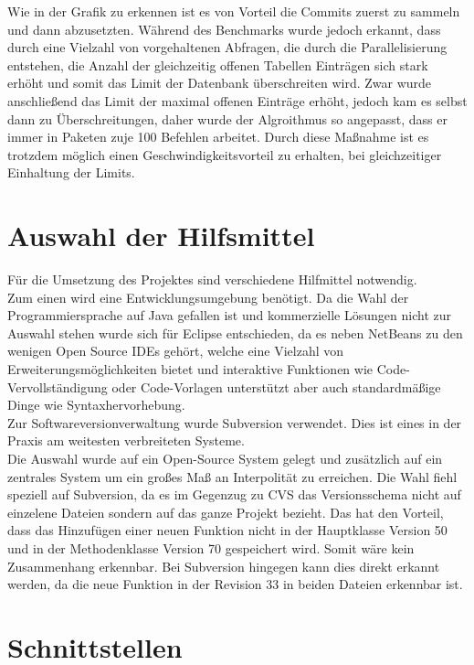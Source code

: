 Wie in der Grafik zu erkennen ist es von Vorteil die Commits zuerst zu sammeln und dann abzusetzten.
Während des Benchmarks wurde jedoch erkannt, dass durch eine Vielzahl von vorgehaltenen Abfragen, die durch die Parallelisierung entstehen, die Anzahl der gleichzeitig offenen Tabellen Einträgen sich stark erhöht und somit das Limit der Datenbank überschreiten wird.
Zwar wurde anschließend das Limit der maximal offenen Einträge erhöht, jedoch kam es selbst dann zu Überschreitungen, daher wurde der Algroithmus so angepasst, dass er immer in Paketen zuje 100 Befehlen arbeitet. Durch diese Maßnahme ist es trotzdem möglich einen Geschwindigkeitsvorteil zu erhalten, bei gleichzeitiger Einhaltung der Limits.

\section{Auswahl der Hilfsmittel}
\label{sec:hilfsmittelwahl}

Für die Umsetzung des Projektes sind verschiedene Hilfmittel notwendig.\\
Zum einen wird eine Entwicklungsumgebung benötigt.
Da die Wahl der Programmiersprache auf Java gefallen ist und kommerzielle Lösungen nicht zur Auswahl stehen wurde sich für Eclipse entschieden, da es neben NetBeans zu den wenigen Open Source IDEs gehört, welche eine Vielzahl von Erweiterungsmöglichkeiten bietet und interaktive Funktionen wie Code-Vervollständigung oder Code-Vorlagen unterstützt aber auch standardmäßige Dinge wie Syntaxhervorhebung.\\

Zur Softwareversionverwaltung wurde Subversion verwendet. Dies ist eines in der Praxis am weitesten verbreiteten Systeme.\\
Die Auswahl wurde auf ein Open-Source System gelegt und zusätzlich auf ein zentrales System um ein großes Maß an Interpolität zu erreichen. Die Wahl fiehl speziell auf Subversion, da es im Gegenzug zu CVS das Versionsschema nicht auf einzelene Dateien sondern auf das ganze Projekt bezieht. Das hat den Vorteil, dass das Hinzufügen einer neuen Funktion nicht in der Hauptklasse Version 50 und in der Methodenklasse Version 70 gespeichert wird. Somit wäre kein Zusammenhang erkennbar. Bei Subversion hingegen kann dies direkt erkannt werden, da die neue Funktion in der Revision 33 in beiden Dateien erkennbar ist.\\

\section{Schnittstellen}
\label{sec:schnitt}

